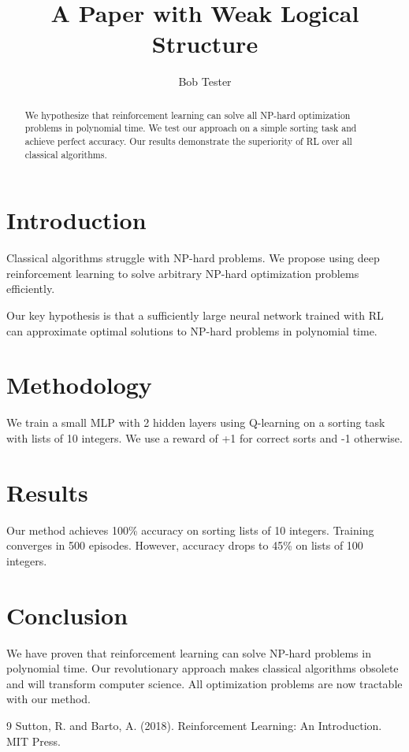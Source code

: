 \documentclass{article}
\title{A Paper with Weak Logical Structure}
\author{Bob Tester}
\begin{document}
\maketitle

\begin{abstract}
We hypothesize that reinforcement learning can solve all NP-hard optimization problems
in polynomial time. We test our approach on a simple sorting task and achieve perfect accuracy.
Our results demonstrate the superiority of RL over all classical algorithms.
\end{abstract}

\section{Introduction}
\label{sec:intro}

Classical algorithms struggle with NP-hard problems. We propose using deep reinforcement
learning to solve arbitrary NP-hard optimization problems efficiently.

Our key hypothesis is that a sufficiently large neural network trained with RL
can approximate optimal solutions to NP-hard problems in polynomial time.

\section{Methodology}
\label{sec:method}

We train a small MLP with 2 hidden layers using Q-learning on a sorting task
with lists of 10 integers. We use a reward of +1 for correct sorts and -1 otherwise.

\section{Results}
\label{sec:results}

Our method achieves 100\% accuracy on sorting lists of 10 integers.
Training converges in 500 episodes. However, accuracy drops to 45\% on lists of 100 integers.

\section{Conclusion}
\label{sec:conclusion}

We have proven that reinforcement learning can solve NP-hard problems in polynomial time.
Our revolutionary approach makes classical algorithms obsolete and will transform
computer science. All optimization problems are now tractable with our method.

\begin{thebibliography}{9}
 Sutton, R. and Barto, A. (2018). Reinforcement Learning: An Introduction. MIT Press.
\end{thebibliography}
\end{document}
